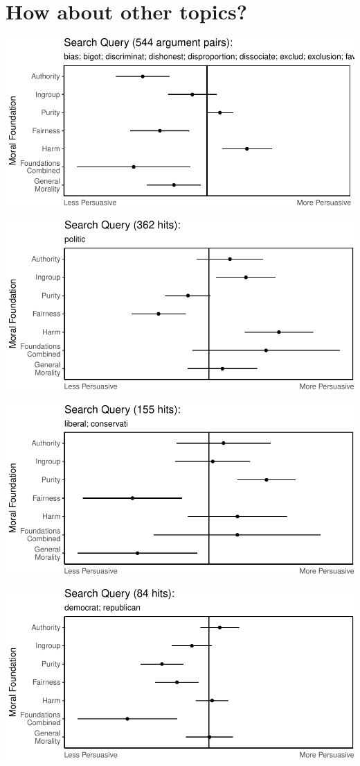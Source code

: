 \documentclass[11pt,]{article}
\begin{document}
\section{How about other topics?}\label{how-about-other-topics}

\includegraphics{prelim_files/figure-latex/unnamed-chunk-15-1.pdf}

\includegraphics{prelim_files/figure-latex/unnamed-chunk-16-1.pdf}

\includegraphics{prelim_files/figure-latex/unnamed-chunk-17-1.pdf}

\includegraphics{prelim_files/figure-latex/unnamed-chunk-18-1.pdf}
\end{document}
